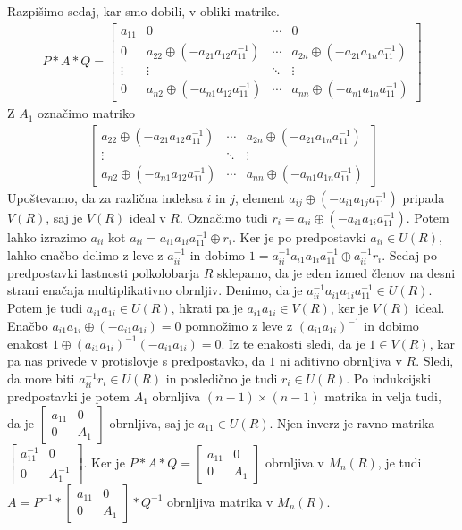 \documentclass[mat1]{fmfdelo}
\begin{document}
\begin{dokaz}
	Razpišimo sedaj, kar smo dobili, v obliki matrike.
	\begin{align*}
		P*A*Q = \begin{bmatrix}
			a_{11} & 0 & \cdots & 0 \\
			0 & a_{22} \oplus (-a_{21}a_{12}a_{11}^{-1}) & \cdots & a_{2n} \oplus (-a_{21}a_{1n}a_{11}^{-1}) \\
			\vdots & \vdots & \ddots & \vdots \\
			0 & a_{n2} \oplus (-a_{n1}a_{12}a_{11}^{-1}) & \cdots & a_{nn} \oplus (-a_{n1}a_{1n}a_{11}^{-1})
		\end{bmatrix}
	\end{align*}
	Z $A_1$ označimo matriko \begin{align*}
		\begin{bmatrix}
			a_{22} \oplus (-a_{21}a_{12}a_{11}^{-1}) & \cdots & a_{2n} \oplus (-a_{21}a_{1n}a_{11}^{-1}) \\
			\vdots & \ddots & \vdots \\
			a_{n2} \oplus (-a_{n1}a_{12}a_{11}^{-1}) & \cdots & a_{nn} \oplus (-a_{n1}a_{1n}a_{11}^{-1})
		\end{bmatrix}
	\end{align*}
Upoštevamo, da za različna indeksa $i$ in $j$, element $a_{ij} \oplus (-a_{i1}a_{1j}a_{11}^{-1})$ pripada $V(R)$, saj je $V(R)$ ideal v $R$. Označimo tudi $r_i = a_{ii} \oplus (-a_{i1}a_{1i}a_{11}^{-1})$. Potem lahko izrazimo $a_{ii}$ kot $a_{ii} = a_{i1}a_{1i}a_{11}^{-1} \oplus r_i$. Ker je po predpostavki $a_{ii}\in U(R)$, lahko enačbo delimo z leve z $a_{ii}^{-1}$ in dobimo $1 = a_{ii}^{-1}a_{i1}a_{1i}a_{11}^{-1} \oplus a_{ii}^{-1}r_i$. Sedaj po predpostavki lastnosti polkolobarja $R$ sklepamo, da je eden izmed členov na desni strani enačaja multiplikativno obrnljiv. Denimo, da je $a_{ii}^{-1}a_{i1}a_{1i}a_{11}^{-1}\in U(R)$. Potem je tudi $a_{i1}a_{1i}\in U(R)$, hkrati pa je $a_{i1}a_{1i}\in V(R)$, ker je $V(R)$ ideal. Enačbo $a_{i1}a_{1i} \oplus (- a_{i1}a_{1i}) = 0$ pomnožimo z leve z $(a_{i1}a_{1i})^{-1}$ in dobimo enakost $1 \oplus (a_{i1}a_{1i})^{-1}(-a_{i1}a_{1i}) = 0$. Iz te enakosti sledi, da je $1\in V(R)$, kar pa nas privede v protislovje s predpostavko, da $1$ ni aditivno obrnljiva v $R$. Sledi, da more biti $a_{ii}^{-1}r_i\in U(R)$ in posledično je tudi $r_i\in U(R)$. Po indukcijski predpostavki je potem $A_1$ obrnljiva $(n-1)\times (n-1)$ matrika in velja tudi, da je $\begin{bmatrix}
	a_{11} & 0 \\
	0 & A_1
\end{bmatrix}$ obrnljiva, saj je $a_{11}\in U(R)$. Njen inverz je ravno matrika $\begin{bmatrix}
a_{11}^{-1} & 0 \\
0 & A_1^{-1}
\end{bmatrix}$. Ker je $P*A*Q = \begin{bmatrix}
a_{11} & 0 \\
0 & A_1
\end{bmatrix}$ obrnljiva v $M_n(R)$, je tudi $A = P^{-1} * \begin{bmatrix}
a_{11} & 0 \\
0 & A_1
\end{bmatrix} * Q^{-1}$ obrnljiva matrika v $M_n(R)$.
\end{dokaz}
\end{document}
